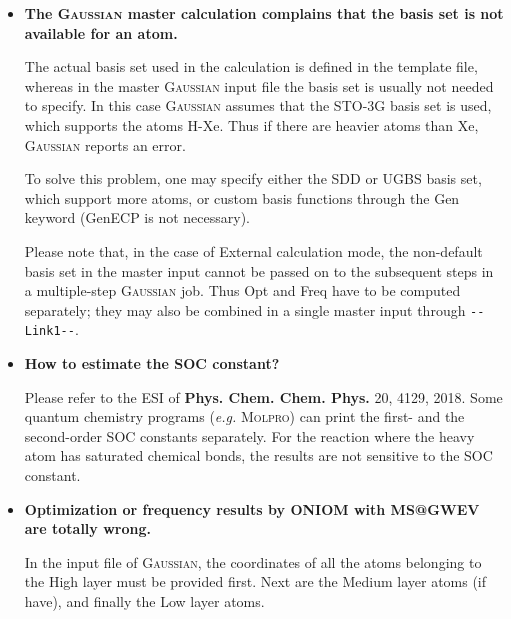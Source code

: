 \documentclass[UTF8]{article}
\begin{document}
\begin{itemize}
\item \textbf{The \textsc{Gaussian} master calculation complains that the basis set is not available for an atom.}

The actual basis set used in the calculation is defined in the template file, whereas in the master \textsc{Gaussian} input file
the basis set is usually not needed to specify. In this case \textsc{Gaussian} assumes that the \textsf{STO-3G} basis set is used,
which supports the atoms H-Xe. Thus if there are heavier atoms than Xe, \textsc{Gaussian} reports an error.

To solve this problem, one may specify either the \textsf{SDD} or \textsf{UGBS} basis set, which support more atoms,
or custom basis functions through the \textsf{Gen} keyword (\textsf{GenECP} is not necessary).

Please note that, in the case of \textsf{External} calculation mode, the non-default basis set in the master input
cannot be passed on to the subsequent steps in a multiple-step \textsc{Gaussian} job.
Thus \textsf{Opt} and \textsf{Freq} have to be computed separately; they may also be combined in a single master input
through \verb|--Link1--|.

\item \textbf{How to estimate the SOC constant?}

Please refer to the ESI of \textbf{Phys. Chem. Chem. Phys.} 20, 4129, 2018.
Some quantum chemistry programs (\textit{e.g.} \textsc{Molpro}) can print the first- and the second-order SOC constants separately.
For the reaction where the heavy atom has saturated chemical bonds, the results are not sensitive to the SOC constant.

\item \textbf{Optimization or frequency results by \textsf{ONIOM} with MS@GWEV are totally wrong.}

In the input file of \textsc{Gaussian}, the coordinates of all the atoms belonging to the High layer must be provided first.
Next are the Medium layer atoms (if have), and finally the Low layer atoms.

\end{itemize}
\end{document}

